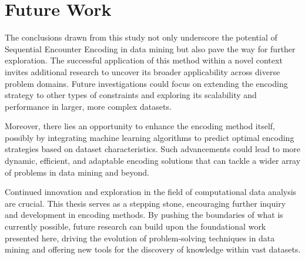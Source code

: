 \section{Future Work}
The conclusions drawn from this study not only underscore the potential of Sequential Encounter Encoding in data mining but also pave the way for further exploration. The successful application of this method within a novel context invites additional research to uncover its broader applicability across diverse problem domains. Future investigations could focus on extending the encoding strategy to other types of constraints and exploring its scalability and performance in larger, more complex datasets.

Moreover, there lies an opportunity to enhance the encoding method itself, possibly by integrating machine learning algorithms to predict optimal encoding strategies based on dataset characteristics. Such advancements could lead to more dynamic, efficient, and adaptable encoding solutions that can tackle a wider array of problems in data mining and beyond.

Continued innovation and exploration in the field of computational data analysis are crucial. This thesis serves as a stepping stone, encouraging further inquiry and development in encoding methods. By pushing the boundaries of what is currently possible, future research can build upon the foundational work presented here, driving the evolution of problem-solving techniques in data mining and offering new tools for the discovery of knowledge within vast datasets.
